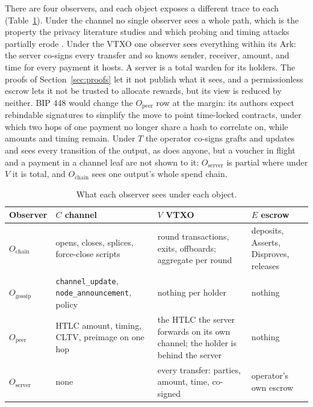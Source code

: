 \documentclass[11pt]{article}
\theoremstyle{plain}
\theoremstyle{definition}
\theoremstyle{remark}
\begin{document}
There are four observers, and each object exposes a different trace to each (Table~\ref{tab:observers}). Under the channel no single observer sees a whole path, which is the property the privacy literature studies and which probing and timing attacks partially erode \citep{herrera2019difficulty,kappos2021empirical,romiti2021crosslayer}. Under the VTXO one observer sees everything within its Ark: the server co-signs every transfer and so knows sender, receiver, amount, and time for every payment it hosts. A server is a total warden for its holders. The proofs of Section~\ref{sec:proofs} let it not publish what it sees, and a permissionless escrow lets it not be trusted to allocate rewards, but its view is reduced by neither. BIP 448 would change the $O_{\mathrm{peer}}$ row at the margin: its authors expect rebindable signatures to simplify the move to point time-locked contracts, under which two hops of one payment no longer share a hash to correlate on, while amounts and timing remain. Under $T$ the operator co-signs grafts and updates and sees every transition of the output, as does anyone, but a voucher in flight and a payment in a channel leaf are not shown to it: $O_{\mathrm{server}}$ is partial where under $V$ it is total, and $O_{\mathrm{chain}}$ sees one output's whole spend chain.

\begin{table}[t]
\centering
\small
\setlength{\tabcolsep}{5pt}
\begin{tabular}{@{}l>{\raggedright\arraybackslash}p{4.2cm}>{\raggedright\arraybackslash}p{4.6cm}>{\raggedright\arraybackslash}p{3.2cm}@{}}
\toprule
Observer & $C$ channel & $V$ VTXO & $E$ escrow \\
\midrule
$O_{\mathrm{chain}}$ & opens, closes, splices, force-close scripts & round transactions, exits, offboards; aggregate per round & deposits, Asserts, Disproves, releases \\
$O_{\mathrm{gossip}}$ & \texttt{channel\_update}, \texttt{node\_announcement}, policy & nothing per holder & nothing \\
$O_{\mathrm{peer}}$ & HTLC amount, timing, CLTV, preimage on one hop & the HTLC the server forwards on its own channel; the holder is behind the server & nothing \\
$O_{\mathrm{server}}$ & none & every transfer: parties, amount, time, co-signed & operator's own escrow \\
\bottomrule
\end{tabular}
\caption{What each observer sees under each object.}
\label{tab:observers}
\end{table}
\end{document}
